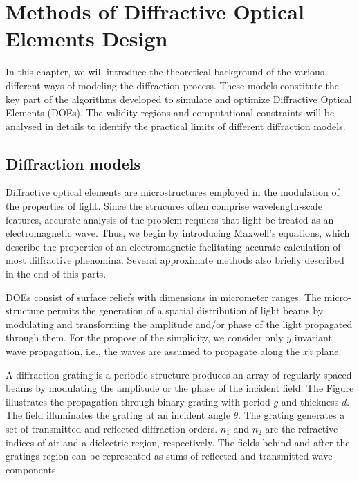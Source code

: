 \cleardoublepage
\chapter{Methods of Diffractive Optical Elements Design}

In this chapter, we will introduce the theoretical background of the various different ways of modeling the diffraction process. 
These models constitute the key part of the algorithms developed to simulate and optimize Diffractive Optical Elements (DOEs). 
The validity regions and computational constraints will be analysed in details to identify the practical limits of different diffraction models.

\section{Diffraction models}
Diffractive optical elements are microstructures employed in the modulation of the properties of light.
Since the strucures often comprise wavelength-scale features, accurate analysis of the problem requiers that light be treated as an electromagnetic wave.
Thus, we begin by introducing Maxwell's equations, which describe the properties of an electromagnetic faclitating accurate calculation of most diffractive phenomina.
Several approximate methods also briefly described in the end of this parts.

DOEs consist of surface reliefs with dimensions in micrometer ranges.
The micro-structure permits the generation of a spatial distribution of light beams by modulating and transforming the amplitude and/or phase of the light propagated through them. For the propose of the simplicity, we consider only $y$ invariant wave propagation, i.e., the waves are assumed to propagate along the $xz$ plane.

A diffraction grating is a periodic structure produces an array of regularly spaced beams by modulating the amplitude or the phase of the incident field.
The Figure illustrates the propagation through binary grating with period $g$ and thickness $d$.
The field illuminates the grating at an incident angle $\theta$.
The grating generates a set of transmitted and reflected diffraction orders. 
$n_1$ and $n_2$ are the refractive indices of air and a dielectric region, respectively.
The fields behind and after the gratings region can be represented as sums of reflected and transmitted wave components.

